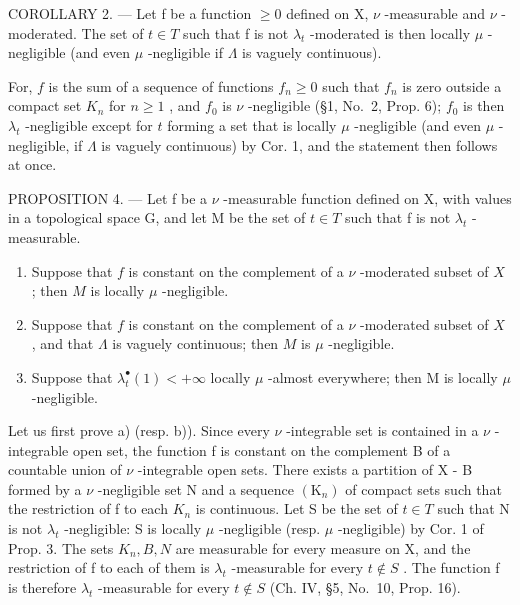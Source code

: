 COROLLARY 2. --- Let f be a function \(\geqslant0\) defined on X, \(\nu\) -measurable and \(\nu\) -moderated. The set of \(t\in T\) such that f is not \(\lambda_{t}\) -moderated is then locally \(\mu\) -negligible (and even \(\mu\) -negligible if \(\Lambda\) is vaguely continuous).

For, \(f\) is the sum of a sequence of functions \(f_{n} \geqslant 0\) such that \(f_{n}\) is zero outside a compact set \(K_{n}\) for \(n \geqslant 1\) , and \(f_{0}\) is \(\nu\) -negligible (§1, No.~2, Prop. 6); \(f_{0}\) is then \(\lambda_{t}\) -negligible except for \(t\) forming a set that is locally \(\mu\) -negligible (and even \(\mu\) -negligible, if \(\Lambda\) is vaguely continuous) by Cor. 1, and the statement then follows at once.

PROPOSITION 4. --- Let f be a \(\nu\) -measurable function defined on X, with values in a topological space G, and let M be the set of \(t \in T\) such that f is not \(\lambda_{t}\) -measurable.

\begin{enumerate}
\def\labelenumi{\alph{enumi})}
\item
  Suppose that \(f\) is constant on the complement of a \(\nu\) -moderated subset of \(X\) ; then \(M\) is locally \(\mu\) -negligible.
\item
  Suppose that \(f\) is constant on the complement of a \(\nu\) -moderated subset of \(X\) , and that \(\Lambda\) is vaguely continuous; then \(M\) is \(\mu\) -negligible.
\item
  Suppose that \(\lambda_t^\bullet(1) < +\infty\) locally \(\mu\) -almost everywhere; then M is locally \(\mu\) -negligible.
\end{enumerate}

Let us first prove a) (resp. b)). Since every \(\nu\) -integrable set is contained in a \(\nu\) -integrable open set, the function f is constant on the complement B of a countable union of \(\nu\) -integrable open sets. There exists a partition of X - B formed by a \(\nu\) -negligible set N and a sequence \((\mathrm{K}_{n})\) of compact sets such that the restriction of f to each \(K_{n}\) is continuous. Let S be the set of \(t \in T\) such that N is not \(\lambda_{t}\) -negligible: S is locally \(\mu\) -negligible (resp. \(\mu\) -negligible) by Cor. 1 of Prop. 3. The sets \(K_{n}, B, N\) are measurable for every measure on X, and the restriction of f to each of them is \(\lambda_{t}\) -measurable for every \(t \notin S\) . The function f is therefore \(\lambda_{t}\) -measurable for every \(t \notin S\) (Ch. IV, §5, No.~10, Prop. 16).

